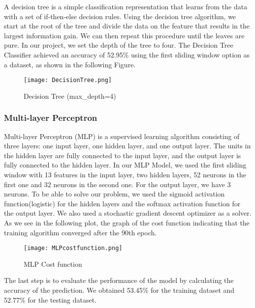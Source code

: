 A decision tree is a simple classification representation that learns from the data with a set of if-then-else decision rules.\newline \newline
Using the decision tree algorithm, we start at the root of the tree and divide the data on the feature that results in the largest information gain. We can then repeat this procedure until the leaves are pure.\newline \newline
In our project, we set the depth of the tree to four.\newline
The Decision Tree Classifier achieved an accuracy of 52.95\% using the first sliding window option as a dataset, as shown in the following Figure.
\begin{figure}[H]
\begin{center}
\texttt{[image: DecisionTree.png]}
\end{center}
\caption{Decision Tree (max\_depth=4)}
\label{fig:DecisionTree}
\end{figure}


\subsubsection{Multi-layer Perceptron}

Multi-layer Perceptron (MLP) is a supervised learning algorithm consisting of three layers: one input layer, one hidden layer, and one output layer. The units in the hidden layer are fully connected to the input layer, and the output layer is fully connected to the hidden layer.\newline \newline %
In our MLP Model, we used the first sliding window with 13 features in the input layer, two hidden layers, 52 neurons in the first one and 32 neurons in the second one. For the output layer, we have 3 neurons.\newline \newline  
To be able to solve our problem, we used the sigmoid activation function(logistic) for the hidden layers and the softmax activation function for the output layer. We also used a stochastic gradient descent optimizer as a solver. \newline 
As we see in the following plot, the graph of the cost function indicating that the training algorithm converged after the 90th epoch. \newline
\begin{figure}[H]
\begin{center}
\texttt{[image: MLPcostfunction.png]}
\end{center}
\caption{MLP Cost function}
\label{fig:MLPcostfunction}
\end{figure}
The last step is to evaluate the performance of the model by calculating the accuracy of the prediction. We obtained 53.45\% for the training dataset and 52.77\% for the testing dataset.

